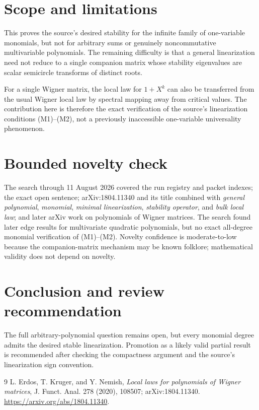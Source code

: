 \documentclass[11pt]{article}
\begin{document}
\section{Scope and limitations}

This proves the source's desired stability for the infinite family of
one-variable monomials, but not for arbitrary sums or genuinely
noncommutative multivariable polynomials. The remaining difficulty is that a
general linearization need not reduce to a single companion matrix whose
stability eigenvalues are scalar semicircle transforms of distinct roots.

For a single Wigner matrix, the local law for $1+X^k$ can also be transferred
from the usual Wigner local law by spectral mapping away from critical values.
The contribution here is therefore the exact verification of the source's
linearization conditions (M1)--(M2), not a previously inaccessible
one-variable universality phenomenon.

\section{Bounded novelty check}

The search through 11 August 2026 covered the run registry and packet indexes;
the exact open sentence; arXiv:1804.11340 and its title combined with
\emph{general polynomial}, \emph{monomial}, \emph{minimal linearization},
\emph{stability operator}, and \emph{bulk local law}; and later arXiv work on
polynomials of Wigner matrices. The search found later edge results for
multivariate quadratic polynomials, but no exact all-degree monomial
verification of (M1)--(M2). Novelty confidence is moderate-to-low because the
companion-matrix mechanism may be known folklore; mathematical validity does
not depend on novelty.

\section{Conclusion and review recommendation}

The full arbitrary-polynomial question remains open, but every monomial degree
admits the desired stable linearization. Promotion as a likely valid partial
result is recommended after checking the compactness argument and the source's
linearization sign convention.

\begin{thebibliography}{9}
L. Erdos, T. Kruger, and Y. Nemish,
\emph{Local laws for polynomials of Wigner matrices},
J. Funct. Anal. 278 (2020), 108507; arXiv:1804.11340.
\url{https://arxiv.org/abs/1804.11340}.
\end{thebibliography}
\end{document}
